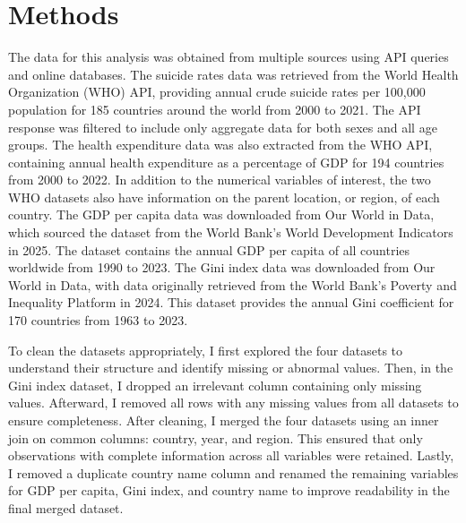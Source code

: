 \documentclass[
]{article}
\begin{document}
\hfill\break
\hfill\break

\section{Methods}\label{methods}

The data for this analysis was obtained from multiple sources using API
queries and online databases. The suicide rates data was retrieved from
the World Health Organization (WHO) API, providing annual crude suicide
rates per 100,000 population for 185 countries around the world from
2000 to 2021. The API response was filtered to include only aggregate
data for both sexes and all age groups. The health expenditure data was
also extracted from the WHO API, containing annual health expenditure as
a percentage of GDP for 194 countries from 2000 to 2022. In addition to
the numerical variables of interest, the two WHO datasets also have
information on the parent location, or region, of each country. The GDP
per capita data was downloaded from Our World in Data, which sourced the
dataset from the World Bank's World Development Indicators in 2025. The
dataset contains the annual GDP per capita of all countries worldwide
from 1990 to 2023. The Gini index data was downloaded from Our World in
Data, with data originally retrieved from the World Bank's Poverty and
Inequality Platform in 2024. This dataset provides the annual Gini
coefficient for 170 countries from 1963 to 2023.

To clean the datasets appropriately, I first explored the four datasets
to understand their structure and identify missing or abnormal values.
Then, in the Gini index dataset, I dropped an irrelevant column
containing only missing values. Afterward, I removed all rows with any
missing values from all datasets to ensure completeness. After cleaning,
I merged the four datasets using an inner join on common columns:
country, year, and region. This ensured that only observations with
complete information across all variables were retained. Lastly, I
removed a duplicate country name column and renamed the remaining
variables for GDP per capita, Gini index, and country name to improve
readability in the final merged dataset.
\end{document}
